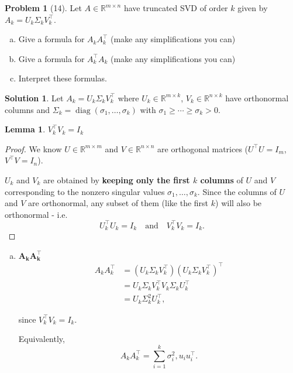 \documentclass{amsart}[11pt]
\newtheorem{lemma}[theorem]{Lemma}
\theoremstyle{definition}
\newtheorem*{problem}{Problem}
\newtheorem*{solution}{Solution}
\newcommand{\R}{\mathbb{R}}
\begin{document}
\begin{problem}[14]
Let $A\in\R^{m\times n}$ have truncated SVD of order $k$ given by $A_k=U_k\Sigma_kV_k^{\top}$. 
\begin{enumerate}[(a)]
\item Give a formula for $A_kA_k^\top$ (make any simplifications you can)
\item Give a formula for $A_k^\top A_k$ (make any simplifications you can)
\item Interpret these formulas.
\end{enumerate}
\end{problem}
\begin{solution}
    Let $A_k=U_k\Sigma_k V_k^{\top}$ where $U_k\in\mathbb R^{m\times k}$, $V_k\in\mathbb R^{n\times k}$ have orthonormal columns and $\Sigma_k=\operatorname{diag}(\sigma_1,\dots,\sigma_k)$ with $\sigma_1\ge\cdots\ge\sigma_k>0$.
        \begin{lemma}
            $V_k^\top V_k=I_k$
        \end{lemma}
        \begin{proof}
            We know $U\in\mathbb R^{m\times m}$ and $V\in\mathbb R^{n\times n}$ are orthogonal matrices ($U^\top U = I_m$, $V^\top V = I_n$).

            $U_k$ and $V_k$ are obtained by \textbf{keeping only the first $k$ columns} of $U$ and $V$ corresponding to the nonzero singular values $\sigma_1,\ldots,\sigma_k$.
            Since the columns of $U$ and $V$ are orthonormal, any subset of them (like the first $k$) will also be orthonormal - i.e.
            \[
                U_k^\top U_k = I_k \quad \text{and} \quad V_k^\top V_k = I_k.
            \]
        \end{proof}
        \begin{enumerate}[(a)]
            \item $\mathbf{A_kA_k^\top}$
        \[
            \begin{aligned}
            A_kA_k^\top &= (U_k\Sigma_k V_k^\top)(U_k\Sigma_k V_k^\top)^\top\\
            &= U_k\Sigma_k V_k^\top V_k\Sigma_k U_k^\top \\
            &= U_k\Sigma_k^2 U_k^\top,
            \end{aligned}
            \]

            since $V_k^\top V_k=I_k$.

            Equivalently,
            \[
            A_kA_k^\top=\sum_{i=1}^k \sigma_i^2,u_i u_i^\top.
            \]


\end{enumerate}
\end{solution}
\end{document}
